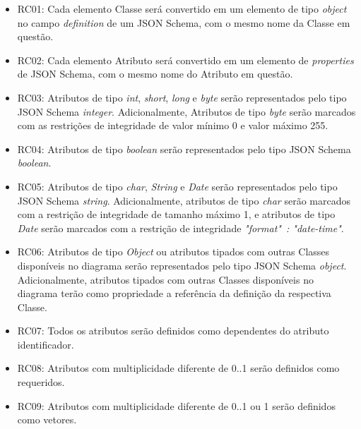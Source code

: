 \begin{itemize}
    \item RC01: Cada elemento Classe será convertido em um elemento de tipo \textit{object} no campo \textit{definition} de um JSON Schema, com o mesmo nome da Classe em questão.

    \item RC02: Cada elemento Atributo será convertido em um elemento de \textit{properties} de JSON Schema, com o mesmo nome do Atributo em questão.

    \item RC03: Atributos de tipo \textit{int}, \textit{short}, \textit{long} e \textit{byte} serão representados pelo tipo JSON Schema \textit{integer}. Adicionalmente, Atributos de tipo \textit{byte} serão marcados com as restrições de integridade de valor mínimo 0 e valor máximo 255.

    \item RC04: Atributos de tipo \textit{boolean} serão representados pelo tipo JSON Schema \textit{boolean}.

    \item RC05: Atributos de tipo \textit{char}, \textit{String} e \textit{Date} serão representados pelo tipo JSON Schema \textit{string}. Adicionalmente, atributos de tipo \textit{char} serão marcados com a restrição de integridade de tamanho máximo 1, e atributos de tipo \textit{Date} serão marcados com a restrição de integridade \textit{"format"\ : "date-time"}.

    \item RC06: Atributos de tipo \textit{Object} ou atributos tipados com outras Classes disponíveis no diagrama serão representados pelo tipo JSON Schema \textit{object}. Adicionalmente, atributos tipados com outras Classes disponíveis no diagrama terão como propriedade a referência da definição da respectiva Classe.

    \item RC07: Todos os atributos serão definidos como dependentes do atributo identificador.

    \item RC08: Atributos com multiplicidade diferente de 0..1 serão definidos como requeridos.

    \item RC09: Atributos com multiplicidade diferente de 0..1 ou 1 serão definidos como vetores.
\end{itemize}


